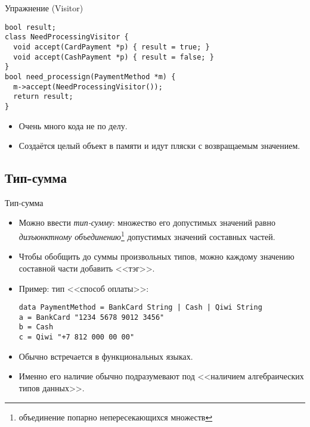 \begin{frame}[fragile]{Упражнение (Visitor)}
\begin{verbatim}
bool result;
class NeedProcessingVisitor {
  void accept(CardPayment *p) { result = true; }
  void accept(CashPayment *p) { result = false; }
}
bool need_processign(PaymentMethod *m) {
  m->accept(NeedProcessingVisitor());
  return result;
}
\end{verbatim}
	\begin{itemize}
		\item Очень много кода не по делу.
		\item Создаётся целый объект в памяти и идут пляски с возвращаемым значением.
	\end{itemize}
\end{frame}

\subsection{Тип-сумма}
\begin{frame}[fragile]{Тип-сумма}
	\begin{itemize}
		\item Можно ввести \textit{тип-сумму}: множество его допустимых значений равно \textit{дизъюнктному объединению}\footnote{объединение попарно непересекающихся множеств} допустимых значений составных частей.
		\item Чтобы обобщить до суммы произвольных типов, можно каждому значению составной части добавить <<тэг>>.
		\item Пример: тип <<способ оплаты>>:
\begin{verbatim}
data PaymentMethod = BankCard String | Cash | Qiwi String
a = BankCard "1234 5678 9012 3456"
b = Cash
c = Qiwi "+7 812 000 00 00"
\end{verbatim}
		\item Обычно встречается в функциональных языках.
		\item Именно его наличие обычно подразумевают под <<наличием алгебраических типов данных>>.
	\end{itemize}
\end{frame}

